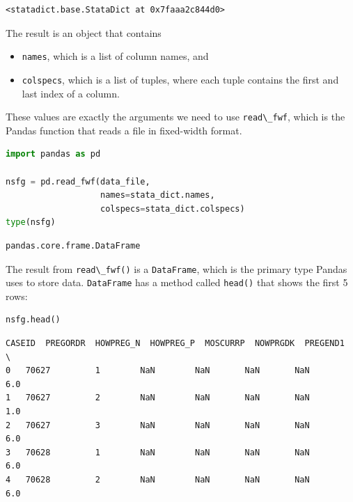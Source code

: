 \begin{lstlisting}[style=output]
<statadict.base.StataDict at 0x7faaa2c844d0>
\end{lstlisting}

The result is an object that contains

\begin{itemize}
\item
  \passthrough{\lstinline!names!}, which is a list of column names, and
\item
  \passthrough{\lstinline!colspecs!}, which is a list of tuples, where
  each tuple contains the first and last index of a column.
\end{itemize}

These values are exactly the arguments we need to use
\passthrough{\lstinline!read\_fwf!}, which is the Pandas function that
reads a file in fixed-width format.

\begin{lstlisting}[language=Python,style=source]
import pandas as pd

nsfg = pd.read_fwf(data_file, 
                   names=stata_dict.names, 
                   colspecs=stata_dict.colspecs)
type(nsfg)
\end{lstlisting}

\begin{lstlisting}[style=output]
pandas.core.frame.DataFrame
\end{lstlisting}

The result from \passthrough{\lstinline!read\_fwf()!} is a
\passthrough{\lstinline!DataFrame!}, which is the primary type Pandas
uses to store data. \passthrough{\lstinline!DataFrame!} has a method
called \passthrough{\lstinline!head()!} that shows the first 5 rows:

\begin{lstlisting}[language=Python,style=source]
nsfg.head()
\end{lstlisting}

\begin{lstlisting}[style=output]
   CASEID  PREGORDR  HOWPREG_N  HOWPREG_P  MOSCURRP  NOWPRGDK  PREGEND1  \
0   70627         1        NaN        NaN       NaN       NaN       6.0   
1   70627         2        NaN        NaN       NaN       NaN       1.0   
2   70627         3        NaN        NaN       NaN       NaN       6.0   
3   70628         1        NaN        NaN       NaN       NaN       6.0   
4   70628         2        NaN        NaN       NaN       NaN       6.0   
\end{lstlisting}

